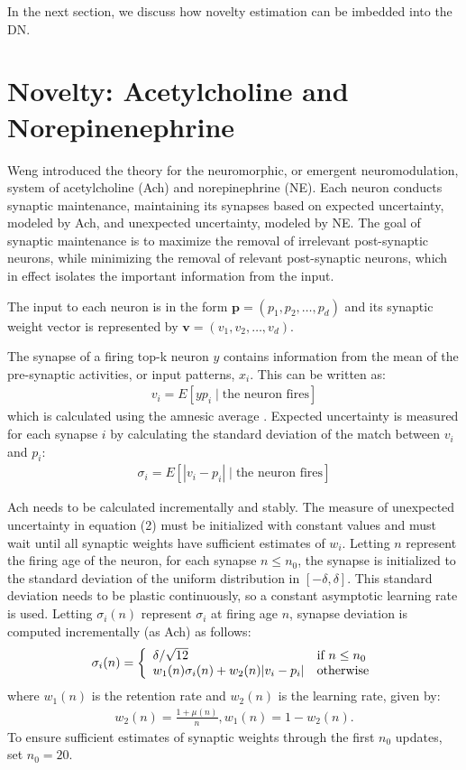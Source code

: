 \documentclass[conference]{IEEEtran}
\begin{document}
In the next section, we discuss how novelty estimation can be imbedded into the DN. 

\section{Novelty: Acetylcholine and Norepinenephrine}

Weng \cite{WengNAI12} introduced the theory for the neuromorphic, or emergent neuromodulation, system of acetylcholine (Ach) and norepinephrine (NE). Each neuron conducts synaptic maintenance, maintaining its synapses based on expected uncertainty, modeled by Ach, and unexpected uncertainty, modeled by NE. The goal of synaptic maintenance is to maximize the removal of irrelevant post-synaptic neurons, while minimizing the removal of relevant post-synaptic neurons, which in effect isolates the important information from the input.

The input to each neuron is in the form $\mathbf{p}=(p_1,p_2,\dots,p_d)$ and its synaptic weight vector is represented by $\mathbf{v}=(v_1,v_2,\dots,v_d)$.

The synapse of a firing top-k neuron $y$ contains information from the mean of the pre-synaptic activities, or input patterns, $x_i$. This can be written as:
\begin{align}v_i=E[yp_i\; | \;\text{the neuron fires}] \end{align}
which is calculated using the amnesic average \cite{WengNAI12}. Expected uncertainty is measured for each synapse $i$ by calculating the standard deviation of the match between $v_i$ and $p_i$:
\begin{align}\sigma_i=E[|v_i-p_i|\;|\;\text{the neuron fires}]\end{align}

Ach needs to be calculated incrementally and stably. The measure of unexpected uncertainty in equation (2) must be initialized with constant values and must wait until all synaptic weights have sufficient estimates of $w_i$. Letting $n$ represent the firing age of the neuron, for each synapse $n \le n_0$, the synapse is initialized to the standard deviation of the uniform distribution in $[-\delta,\delta]$. This standard deviation needs to be plastic continuously, so a constant asymptotic learning rate is used. Letting $\sigma_i(n)$ represent $\sigma_i$ at firing age $n$, synapse deviation is computed incrementally (as Ach) as follows:
\begin{align}\sigma_i(n)=\left\{
\begin{array}{l l}
\delta/\sqrt{12} &\text{if $n \le n_0$}\\
w_1(n)\sigma_i(n)+w_2(n)|v_i-p_i| & \text{otherwise}
\end{array}\right.\end{align}
where $w_1(n)$ is the retention rate and $w_2(n)$ is the learning rate, given by:
\begin{align}w_2(n)=\frac{1+\mu(n)}{n},w_1(n)=1-w_2(n). \nonumber 
\end{align}
To ensure sufficient estimates of synaptic weights through the first $n_0$ updates, set $n_0=20$. 
\end{document}
